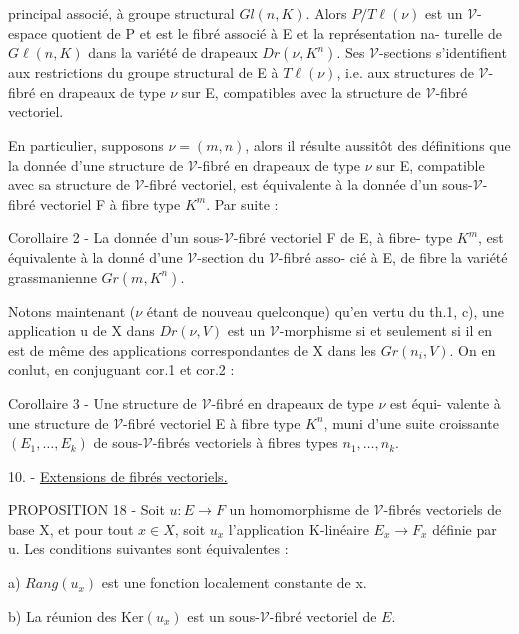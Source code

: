 
principal associé, à groupe structural $Gl(n,K)$. Alors $P/T\ell(\nu)$ est un $\mathcal{V}$-
espace quotient de P et est le fibré associé à E et la représentation na-
turelle de $G\ell(n,K)$ dans la variété de drapeaux $Dr(\nu,K^n)$. Ses $\mathcal{V}$-sections
s'identifient aux restrictions du groupe structural de E à $T\ell(\nu)$, i.e.
aux structures de $\mathcal{V}$-fibré en drapeaux de type $\nu$ sur E, compatibles avec
la structure de $\mathcal{V}$-fibré vectoriel.

En particulier, supposons $\nu = (m,n)$, alors il résulte aussitôt des
définitions que la donnée d'une structure de $\mathcal{V}$-fibré en drapeaux de
type $\nu$ sur E, compatible avec sa structure de $\mathcal{V}$-fibré vectoriel, est
équivalente à la donnée d'un sous-$\mathcal{V}$-fibré vectoriel F à fibre type $K^m$.
Par suite :

Corollaire 2 - La donnée d'un sous-$\mathcal{V}$-fibré vectoriel F de E, à fibre-
type $K^m$, est équivalente à la donné d'une $\mathcal{V}$-section du $\mathcal{V}$-fibré asso-
cié à E, de fibre la variété grassmanienne $Gr(m,K^n)$.

Notons maintenant ($\nu$ étant de nouveau quelconque) qu'en vertu du
th.1, c), une application u de X dans $Dr(\nu,V)$ est un $\mathcal{V}$-morphisme si et
seulement si il en est de même des applications correspondantes de X
dans les $Gr(n_i,V)$. On en conlut, en conjuguant cor.1 et cor.2 :

Corollaire 3 - Une structure de $\mathcal{V}$-fibré en drapeaux de type $\nu$ est équi-
valente à une structure de $\mathcal{V}$-fibré vectoriel E à fibre type $K^n$, muni
d'une suite croissante $(E_1,\dots,E_k)$ de sous-$\mathcal{V}$-fibrés vectoriels à fibres
types $n_1,\dots,n_k$.

10. - \underline{Extensions de fibrés vectoriels.}

PROPOSITION 18 - Soit $u: E \to F$ un homomorphisme de $\mathcal{V}$-fibrés vectoriels
de base X, et pour tout $x \in X$, soit $u_x$ l'application K-linéaire $E_x \to F_x$
définie par u. Les conditions suivantes sont équivalentes :

a) $Rang(u_x)$ est une fonction localement constante de x.

\newpage



b) La réunion des $\mathrm{Ker}(u_x)$ est un sous-$\mathcal{V}$-fibré vectoriel de $E$.

